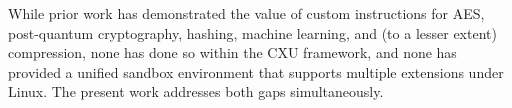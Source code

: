While prior work has demonstrated the value of custom instructions
for AES, post-quantum cryptography, hashing, machine learning, and (to a lesser
extent) compression, none has done so within the CXU framework, and none has
provided a unified sandbox environment that supports multiple extensions under Linux.
The present work addresses both gaps simultaneously.

